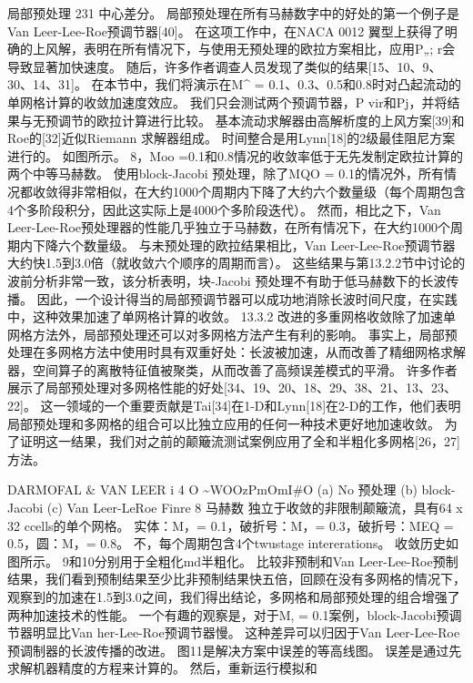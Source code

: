 \documentclass[UTF8,11pt,a4paper,openany,fontset=fandol]{ctexbook}
\begin{document}
局部预处理 231 中心差分。 局部预处理在所有马赫数字中的好处的第一个例子是Van Leer-Lee-Roe预调节器[40]。 在这项工作中，在NACA 0012 翼型上获得了明确的上风解，表明在所有情况下，与使用无预处理的欧拉方案相比，应用P„; r会导致显著加快速度。 随后，许多作者调查人员发现了类似的结果[15、10、9、30、14、31]。 在本节中，我们将演示在M\textasciicircum{} = 0.1、0.3、0.5和0.8时对凸起流动的单网格计算的收敛加速度效应。 我们只会测试两个预调节器，P vir和Pj，并将结果与无预调节的欧拉计算进行比较。 基本流动求解器由高解析度的上风方案[39]和Roe的[32]近似Riemann 求解器组成。 时间整合是用Lynn[18]的2级最佳阻尼方案进行的。 如图所示。 8，Moo =0.1和0.8情况的收敛率低于无先发制定欧拉计算的两个中等马赫数。 使用block-Jacobi 预处理，除了MQO = 0.1的情况外，所有情况都收敛得非常相似，在大约1000个周期内下降了大约六个数量级（每个周期包含4个多阶段积分，因此这实际上是4000个多阶段迭代）。 然而，相比之下，Van Leer-Lee-Roe预处理器的性能几乎独立于马赫数，在所有情况下，在大约1000个周期内下降六个数量级。 与未预处理的欧拉结果相比，Van Leer-Lee-Roe预调节器大约快1.5到3.0倍（就收敛六个顺序的周期而言）。 这些结果与第13.2.2节中讨论的波前分析非常一致，该分析表明，块-Jacobi 预处理不有助于低马赫数下的长波传播。 因此，一个设计得当的局部预调节器可以成功地消除长波时间尺度，在实践中，这种效果加速了单网格计算的收敛。 13.3.2 改进的多重网格收敛除了加速单网格方法外，局部预处理还可以对多网格方法产生有利的影响。 事实上，局部预处理在多网格方法中使用时具有双重好处：长波被加速，从而改善了精细网格求解器，空间算子的离散特征值被聚类，从而改善了高频误差模式的平滑。 许多作者展示了局部预处理对多网格性能的好处[34、19、20、18、29、38、21、13、23、22]。 这一领域的一个重要贡献是Tai[34]在1-D和Lynn[18]在2-D的工作，他们表明局部预处理和多网格的组合可以比独立应用的任何一种技术更好地加速收敛。 为了证明这一结果，我们对之前的颠簸流测试案例应用了全和半粗化多网格[26，27]方法。

DARMOFAL \& VAN LEER i 4 O \textasciitilde{}WOOzPmOmI\#O (a) No 预处理 (b) block-Jacobi (c) Van Leer-LeRoe Finre 8 马赫数 独立于收敛的非限制颠簸流，具有64 x 32 ccells的单个网格。 实体：M，= 0.1，破折号：M，= 0.3，破折号：MEQ = 0.5，圆：M，= 0.8。 不，每个周期包含4个twustage intererations。 收敛历史如图所示。 9和10分别用于全粗化md半粗化。 比较非预制和Van Leer-Lee-Roe预制结果，我们看到预制结果至少比非预制结果快五倍，回顾在没有多网格的情况下，观察到的加速在1.5到3.0之间，我们得出结论，多网格和局部预处理的组合增强了两种加速技术的性能。 一个有趣的观察是，对于M, = 0.1案例，block-Jacobi预调节器明显比Van her-Lee-Roe预调节器慢。 这种差异可以归因于Van Leer-Lee-Roe预调制器的长波传播的改进。 图11是解决方案中误差的等高线图。 误差是通过先求解机器精度的方程来计算的。 然后，重新运行模拟和
\end{document}

